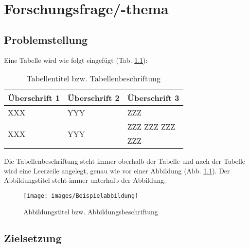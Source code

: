 \pagestyle{plain}
\chapter{Forschungsfrage/-thema}

\section{Problemstellung}

\noindent Eine Tabelle wird wie folgt eingefügt (Tab. \ref{tab:Beispieltabelle}):

\begin{table}[H]
	\caption{Tabellentitel bzw. Tabellenbeschriftung} \label{tab:Beispieltabelle}
	\begin{tabularx}{1\textwidth}{|l|p{}|X|}\hline
		Überschrift 1 & Überschrift 2 & Überschrift 3\\
		\hline
		\hline
		XXX & YYY & ZZZ\\
		\hline
		\multirow{4}{*}{XXX}
			& \multirow{3}{*}{YYY} & ZZZ \newline ZZZ \newline ZZZ\\ 
			\cline{2-3}
			& YYY & ZZZ\\
		\hline
	\end{tabularx}
\end{table}

\noindent Die Tabellenbeschriftung steht immer oberhalb der Tabelle und nach der Tabelle wird eine Leerzeile angelegt, 
genau wie vor einer Abbildung (Abb. \ref{fig:Beispielabbildung}). 
Der Abbildungstitel steht immer unterhalb der Abbildung.

\begin{figure}[H]
	\centering
	\texttt{[image: images/Beispielabbildung]}
	\caption{Abbildungstitel bzw. Abbildungsbeschriftung}
	\label{fig:Beispielabbildung}
\end{figure}

\section{Zielsetzung}
\noindent \blindtext{}
\blindtext{}
\blindtext{}
\blindtext{}
\blindtext{}